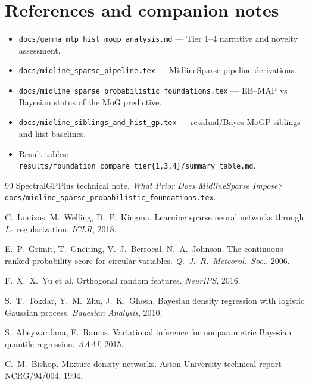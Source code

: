 \documentclass[11pt,a4paper]{article}
\theoremstyle{definition}
\begin{document}
\section*{References and companion notes}
\begin{itemize}[leftmargin=1.4em,itemsep=0.15em]
  \item \texttt{docs/gamma\_mlp\_hist\_mogp\_analysis.md} --- Tier 1--4 narrative
        and novelty assessment.
  \item \texttt{docs/midline\_sparse\_pipeline.tex} --- MidlineSparse
        pipeline derivations.
  \item \texttt{docs/midline\_sparse\_probabilistic\_foundations.tex} ---
        EB--MAP vs Bayesian status of the MoG predictive.
  \item \texttt{docs/midline\_siblings\_and\_hist\_gp.tex} --- residual/Bayes
        MoGP siblings and hist baselines.
  \item Result tables:
        \texttt{results/foundation\_compare\_tier\{1,3,4\}/summary\_table.md}.
\end{itemize}

\begin{thebibliography}{99}
SpectralGPPlus technical note.
\textit{What Prior Does MidlineSparse Impose?}
\texttt{docs/midline\_sparse\_probabilistic\_foundations.tex}.

C.~Louizos, M.~Welling, D.~P.~Kingma.
Learning sparse neural networks through $L_0$ regularization.
\textit{ICLR}, 2018.

E.~P.~Grimit, T.~Gneiting, V.~J.~Berrocal, N.~A.~Johnson.
The continuous ranked probability score for circular variables.
\textit{Q.\ J.\ R.\ Meteorol.\ Soc.}, 2006.

F.~X.~X.~Yu et al.
Orthogonal random features.
\textit{NeurIPS}, 2016.

S.~T.~Tokdar, Y.~M.~Zhu, J.~K.~Ghosh.
Bayesian density regression with logistic Gaussian process.
\textit{Bayesian Analysis}, 2010.

S.~Abeywardana, F.~Ramos.
Variational inference for nonparametric Bayesian quantile regression.
\textit{AAAI}, 2015.

C.~M.~Bishop.
Mixture density networks.
Aston University technical report NCRG/94/004, 1994.
\end{thebibliography}
\end{document}
